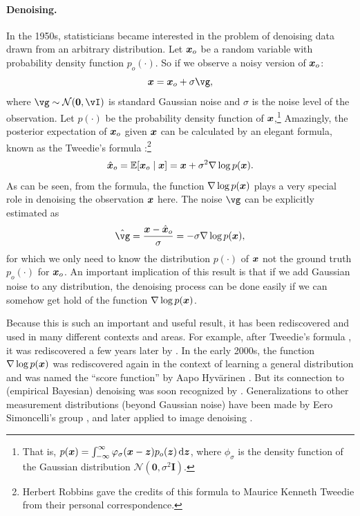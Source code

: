 \documentclass[../../book-main.tex]{subfiles}
\begin{document}
\paragraph{Denoising.} In the 1950s, statisticians became interested in the problem of denoising data drawn from an arbitrary distribution. Let $\bm{x}_o$ be a random variable with probability density function $p_o(\cdot)$. So if we observe a noisy version of $\bm{x}_o$:
\begin{equation}
    \x = \x_o + \sigma \vg, 
\end{equation}
where $\vg \sim \dNorm(\vzero, \vI)$ is standard Gaussian noise and $\sigma$ is the noise level of the observation. Let $p(\cdot)$ be the probability density function of $\bm{x}$,\footnote{That is, $p(\x) = \int_{-\infty}^{\infty} \phi_{\sigma}(\x - \z)p_o(\z) \odif{\z}$, where $\phi_{\sigma}$ is the density function of the Gaussian distribution $\mathcal{N}(\boldsymbol{0}, \sigma^2 \boldsymbol{I})$.} Amazingly, the posterior expectation of $\bm{x}_o$ given $\bm{x}$ can be calculated by an elegant formula, known as the Tweedie's formula \cite{Robbins1956AnEB}:\footnote{Herbert Robbins gave the credits of this formula to Maurice Kenneth Tweedie from their personal correspondence.}
\begin{equation}
    \hat {\bm{x}}_o = \mathbb{E}[\bm{x}_o\mid \bm{x}] = \bm{x} + \sigma^2 \nabla \log p(\bm{x}).
\end{equation}
As can be seen, from the formula, the function $\nabla \log p(\bm{x})$ plays a very special role in denoising the observation $\bm{x}$ here. The noise $\vg$ can be explicitly estimated as
\begin{equation}
    \hat{\vg} = \frac{\x - \hat \x_o}{\sigma} = -\sigma \nabla \log p(\x),
\end{equation}
for which we only need to know the distribution $p(\cdot)$ of $\bm{x}$ not the ground truth $p_o(\cdot)$ for $\bm{x}_o$. An important implication of this result is that if we add Gaussian noise to any distribution, the denoising process can be done easily if we can somehow get hold of the function $\nabla \log p(\bm{x})$.

Because this is such an important and useful result, it has been rediscovered and used in many different contexts and areas. For example, after Tweedie's formula \cite{Robbins1956AnEB}, it was rediscovered a few years later by \cite{Miyasawa61}. In the early 2000s, the function $\nabla \log p(\bm{x})$ was rediscovered again in the context of learning a general distribution and was named the ``score function'' by Aapo Hyv\"{a}rinen \cite{hyvarinen05a}. But its connection to (empirical Bayesian) denoising was soon recognized by \cite{Vincent2011}.
Generalizations to other measurement distributions (beyond Gaussian noise) have been made by Eero Simoncelli's group \cite{Raphan10}, and later applied to image denoising \cite{Kadkhodaie21a,ho2020denoising}.
\end{document}
